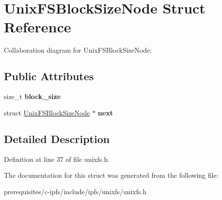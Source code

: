 \hypertarget{struct_unix_f_s_block_size_node}{}\section{Unix\+F\+S\+Block\+Size\+Node Struct Reference}
\label{struct_unix_f_s_block_size_node}


Collaboration diagram for Unix\+F\+S\+Block\+Size\+Node\+:
\subsection*{Public Attributes}
\begin{DoxyCompactItemize}
\item 
\mbox{\label{struct_unix_f_s_block_size_node_a332ab155727a42bd60eaa6860265f6e9}} 
size\+\_\+t {\bfseries block\+\_\+size}
\item 
\mbox{\label{struct_unix_f_s_block_size_node_a585e29853c6582616383dd4848ddd6c4}} 
struct \mbox{\hyperlink{struct_unix_f_s_block_size_node}{Unix\+F\+S\+Block\+Size\+Node}} $\ast$ {\bfseries next}
\end{DoxyCompactItemize}


\subsection{Detailed Description}


Definition at line 37 of file unixfs.\+h.



The documentation for this struct was generated from the following file\+:\begin{DoxyCompactItemize}
\item 
prerequisites/c-\/ipfs/include/ipfs/unixfs/unixfs.\+h\end{DoxyCompactItemize}
